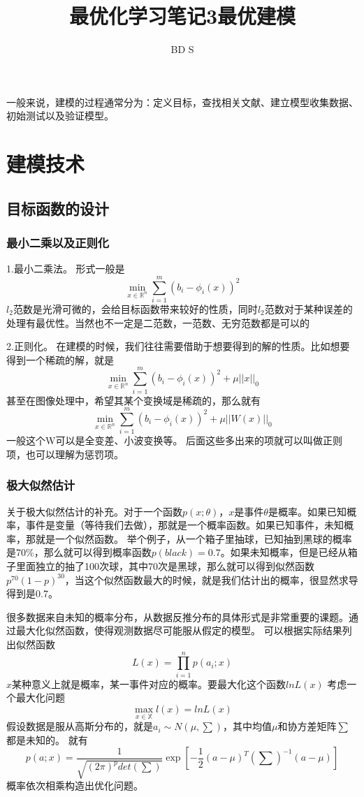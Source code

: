 \documentclass{article}
\title{最优化学习笔记3最优建模}
\author{BD S}
\begin{document}
\maketitle
\tableofcontents
\newpage
一般来说，建模的过程通常分为：定义目标，查找相关文献、建立模型收集数据、初始测试以及验证模型。
\section{建模技术}
\subsection{目标函数的设计}
\subsubsection{最小二乘以及正则化}
1.最小二乘法。
形式一般是
$$
\min\limits_{x \in \mathbb{R}^n} \sum\limits_{i=1}^m (b_i-\phi_i(x))^2
$$
$l_2$范数是光滑可微的，会给目标函数带来较好的性质，同时$l_2$范数对于某种误差的处理有最优性。当然也不一定是二范数，一范数、无穷范数都是可以的

2.正则化。
在建模的时候，我们往往需要借助于想要得到的解的性质。比如想要得到一个稀疏的解，就是
$$
\min\limits_{x \in \mathbb{R}^n} \sum\limits_{i=1}^m (b_i-\phi_i(x))^2+\mu||x||_0
$$
甚至在图像处理中，希望其某个变换域是稀疏的，那么就有
$$
\min\limits_{x \in \mathbb{R}^n} \sum\limits_{i=1}^m (b_i-\phi_i(x))^2+\mu||W(x)||_0
$$
一般这个W可以是全变差、小波变换等。
后面这些多出来的项就可以叫做正则项，也可以理解为惩罚项。
\subsubsection{极大似然估计}
关于极大似然估计的补充。对于一个函数$p(x;\theta)$，$x$是事件$\theta$是概率。如果已知概率，事件是变量（等待我们去做），那就是一个概率函数。如果已知事件，未知概率，那就是一个似然函数。
举个例子，从一个箱子里抽球，已知抽到黑球的概率是70\%，那么就可以得到概率函数$p(black)=0.7$。如果未知概率，但是已经从箱子里面独立的抽了100次球，其中70次是黑球，那么就可以得到似然函数$p^{70}(1-p)^{30}$，当这个似然函数最大的时候，就是我们估计出的概率，很显然求导得到是0.7。

很多数据来自未知的概率分布，从数据反推分布的具体形式是非常重要的课题。通过最大化似然函数，使得观测数据尽可能服从假定的模型。
可以根据实际结果列出似然函数
$$
L(x)=\prod_{i=1}^n p(a_i;x)
$$
$x$某种意义上就是概率，某一事件对应的概率。要最大化这个函数$lnL(x)$
考虑一个最大化问题
$$\max\limits_{x \in \mathbb{X}} l(x)=lnL(x)$$
假设数据是服从高斯分布的，就是$a_i\sim N(\mu,\sum)$，其中均值$\mu$和协方差矩阵$\sum$都是未知的。
就有$$
p(a;x)=\frac{1}{\sqrt{(2\pi)^p det(\sum)}}\exp[-\frac{1}{2}(a-\mu)^T(\sum)^{-1}(a-\mu)]
$$
概率依次相乘构造出优化问题。
\end{document}
